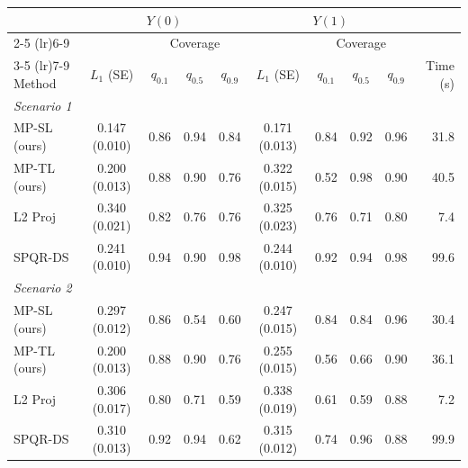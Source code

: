 \begin{tabular}{lccccccccr}
\toprule
 & \multicolumn{4}{c}{$Y(0)$} & \multicolumn{4}{c}{$Y(1)$} &  \\
\cmidrule(lr){2-5} \cmidrule(lr){6-9}
 &  & \multicolumn{3}{c}{Coverage} &  & \multicolumn{3}{c}{Coverage} &  \\
\cmidrule(lr){3-5} \cmidrule(lr){7-9}
Method & $L_1$ (SE) & $q_{0.1}$ & $q_{0.5}$ & $q_{0.9}$ & $L_1$ (SE) & $q_{0.1}$ & $q_{0.5}$ & $q_{0.9}$ & Time (s) \\
\midrule
\multicolumn{10}{l}{\textit{Scenario 1}} \\
MP-SL (ours) & 0.147 (0.010) & 0.86 & 0.94 & 0.84 & 0.171 (0.013) & 0.84 & 0.92 & 0.96 & 31.8 \\
MP-TL (ours) & 0.200 (0.013) & 0.88 & 0.90 & 0.76 & 0.322 (0.015) & 0.52 & 0.98 & 0.90 & 40.5 \\
L2 Proj & 0.340 (0.021) & 0.82 & 0.76 & 0.76 & 0.325 (0.023) & 0.76 & 0.71 & 0.80 & 7.4 \\
SPQR-DS & 0.241 (0.010) & 0.94 & 0.90 & 0.98 & 0.244 (0.010) & 0.92 & 0.94 & 0.98 & 99.6 \\
\midrule
\multicolumn{10}{l}{\textit{Scenario 2}} \\
MP-SL (ours) & 0.297 (0.012) & 0.86 & 0.54 & 0.60 & 0.247 (0.015) & 0.84 & 0.84 & 0.96 & 30.4 \\
MP-TL (ours) & 0.200 (0.013) & 0.88 & 0.90 & 0.76 & 0.255 (0.015) & 0.56 & 0.66 & 0.90 & 36.1 \\
L2 Proj & 0.306 (0.017) & 0.80 & 0.71 & 0.59 & 0.338 (0.019) & 0.61 & 0.59 & 0.88 & 7.2 \\
SPQR-DS & 0.310 (0.013) & 0.92 & 0.94 & 0.62 & 0.315 (0.012) & 0.74 & 0.96 & 0.88 & 99.9 \\
\bottomrule
\end{tabular}
